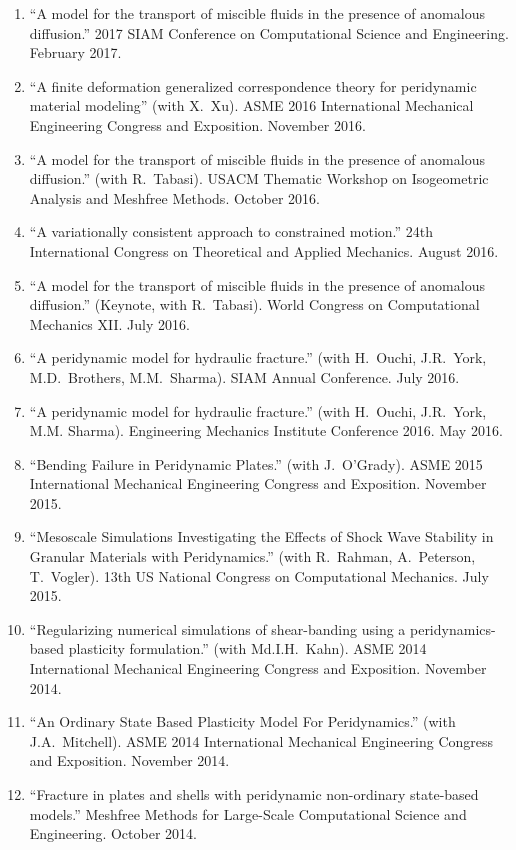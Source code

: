 \begin{etaremune}
\begin{enumerate}
    \item ``A model for the transport of miscible fluids in the presence of anomalous diffusion.'' 2017 SIAM Conference on Computational Science and Engineering.  February 2017.
    \item ``A finite deformation generalized correspondence theory for peridynamic material modeling'' (with X.\ Xu). ASME 2016 International Mechanical Engineering Congress and Exposition. November 2016.
    \item ``A model for the transport of miscible fluids in the presence of anomalous diffusion.'' (with R.\ Tabasi). USACM Thematic Workshop on Isogeometric Analysis and Meshfree Methods.  October 2016.
    \item ``A variationally consistent approach to constrained motion.'' 24th International Congress on Theoretical and Applied Mechanics.  August 2016.
    \item ``A model for the transport of miscible fluids in the presence of anomalous diffusion.'' (Keynote, with R.\ Tabasi). World Congress on Computational Mechanics XII.  July 2016.
    \item ``A peridynamic model for hydraulic fracture.'' (with H.\ Ouchi, J.R.\ York, M.D.\ Brothers, M.M.\ Sharma). SIAM Annual Conference.  July 2016.
    \item ``A peridynamic model for hydraulic fracture.'' (with H.\ Ouchi, J.R.\ York, M.M. Sharma). Engineering Mechanics Institute Conference 2016. May 2016.
    \item ``Bending Failure in Peridynamic Plates.'' (with J.~O'Grady). ASME 2015 International Mechanical Engineering Congress and Exposition. November 2015.
    \item ``Mesoscale Simulations Investigating the Effects of Shock Wave Stability in Granular Materials with Peridynamics.'' (with R.~Rahman, A.~Peterson, T.~Vogler). 13th US National Congress on Computational Mechanics. July 2015.
    \item ``Regularizing numerical simulations of shear-banding using a peridynamics-based plasticity formulation.'' (with Md.I.H.~Kahn). ASME 2014 International Mechanical Engineering Congress and Exposition. November 2014.
    \item ``An Ordinary State Based Plasticity Model For Peridynamics.'' (with J.A.~Mitchell). ASME 2014 International Mechanical Engineering Congress and Exposition. November 2014.
    \item ``Fracture in plates and shells with peridynamic non-ordinary state-based models.''  Meshfree Methods for Large-Scale Computational Science and Engineering. October 2014.

\end{enumerate}
\end{etaremune}
